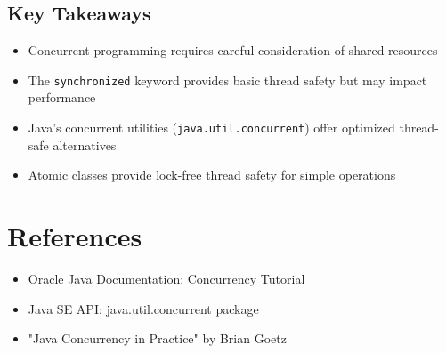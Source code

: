 \documentclass[12pt,a4paper]{article}
\begin{document}
\subsection{Key Takeaways}
\begin{itemize}
    \item Concurrent programming requires careful consideration of shared resources
    \item The \texttt{synchronized} keyword provides basic thread safety but may impact performance
    \item Java's concurrent utilities (\texttt{java.util.concurrent}) offer optimized thread-safe alternatives
    \item Atomic classes provide lock-free thread safety for simple operations
\end{itemize}

\section{References}
\begin{itemize}
    \item Oracle Java Documentation: Concurrency Tutorial
    \item Java SE API: java.util.concurrent package
    \item "Java Concurrency in Practice" by Brian Goetz
\end{itemize}
\end{document}
